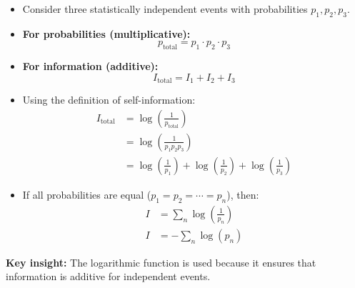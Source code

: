 \documentclass[11pt,a4paper]{book}
\newenvironment{derivationbox}[1][Derivation]{
    \begin{tcolorbox}[
        enhanced,
        breakable,
        colback=softpeach!10,
        colframe=softpeach!200,
        title=#1,
        fonttitle=\bfseries,
        sharp corners,
        boxrule=0.8pt,
        left=10pt,
        right=10pt,
        top=8pt,
        bottom=8pt
    ]
}{
    \end{tcolorbox}
}
\begin{document}
\begin{derivationbox}[Logarithmic Relation of Information and Probability]
    \begin{itemize}[label=$\rightarrow$]
        \item Consider three statistically independent events with probabilities \(p_1, p_2, p_3\).

        \item \textbf{For probabilities (multiplicative):}
              \[
                  p_{\text{total}} = p_1 \cdot p_2 \cdot p_3
              \]

        \item \textbf{For information (additive):}
              \[
                  I_{\text{total}} = I_1 + I_2 + I_3
              \]

        \item Using the definition of self-information:
              \begin{align*}
                  I_{\text{total}}
                    & = \log\left(\frac{1}{p_{\text{total}}}\right) \\
                    & = \log\left(\frac{1}{p_1p_2p_3}\right) \\
                    & = \log\left(\frac{1}{p_1}\right)
                      + \log\left(\frac{1}{p_2}\right)
                      + \log\left(\frac{1}{p_3}\right)
              \end{align*}

        \item If all probabilities are equal (\(p_1=p_2=\cdots=p_n\)), then:
              \begin{align*}
                  I & = \sum_{n} \log\left(\frac{1}{p_n}\right) \\
                  I & = -\sum_{n} \log(p_n)
              \end{align*}
    \end{itemize}

    \textbf{Key insight:} The logarithmic function is used because it ensures that information is additive for independent events.
\end{derivationbox}
\end{document}
